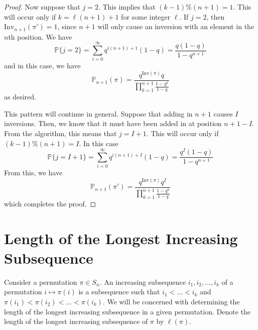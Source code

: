 \documentclass[12pt]{report}
\theoremstyle{definition}
\begin{document}
\begin{proof}
Now suppose that $j=2$.  This implies that $(k-1)\%(n+1)=1$.  This will occur only if $k=\ell(n+1)+1$ for some integer $\ell$.  If $j=2$, then $\mathrm{Inv}_{n+1}(\pi ')=1$, since $n+1$ will only cause an inversion with an element in the $n$th position.  We have
$$
\mathbb{P}\{j=2\}=\sum_{i=0}^{\infty} q^{i(n+1)+1}(1-q)=\frac{q(1-q)}{1-q^{n+1}}
$$
and in this case, we have 
$$
\mathbb{P}_{n+1}(\pi)=\frac{q^{\mathrm{Inv}(\pi)}q}{\prod_{k=1}^{n+1}\frac{1-q^k}{1-q}}
$$
as desired.  

This pattern will continue in general.  Suppose that adding in $n+1$ causes $I$ inversions.  Then, we know that it must have been added in at position $n+1-I$.  From the algorithm, this means that $j=I+1$.  This will occur only if $(k-1)\%(n+1)=I$.  In this case 
$$
\mathbb{P}\{j=I+1\}=\sum_{i=0}^{\infty}q^{i(n+1)+I}(1-q)=\frac{q^I(1-q)}{1-q^{n+1}}
$$
From this, we have 
$$
\mathbb{P}_{n+1}(\pi')=\frac{q^{\mathrm{Inv}(\pi)}q^{I}}{\prod_{k=1}^{n+1}\frac{1-q^k}{1-q}}
$$
which completes the proof.
\end{proof}

\section{Length of the Longest Increasing Subsequence}

Consider a permutation $\pi\in S_n$.  An increasing subsequence $i_1,i_2,\dots,i_k$ of a permutation $i\mapsto \pi(i)$ is a subsequence such that 
$i_1<\dots<i_k$ and $\pi(i_1)<\pi(i_2)<\dots<\pi(i_k)$.  We will be concerned with determining the length of the longest increasing subsequence in a given permutation.  Denote the length of the longest increasing subsequence of $\pi$ by $\ell(\pi)$.  
\end{document}
